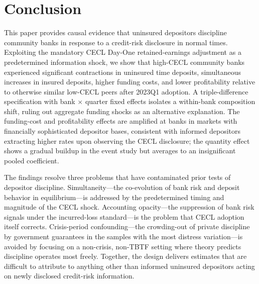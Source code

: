 
\section{Conclusion}
\label{sec:conclusion}

This paper provides causal evidence that uninsured depositors discipline community
banks in response to a credit-risk disclosure in normal times.  Exploiting the
mandatory CECL Day-One retained-earnings adjustment as a predetermined information
shock, we show that high-CECL community banks experienced significant contractions
in uninsured time deposits, simultaneous increases in insured deposits, higher
funding costs, and lower profitability relative to otherwise similar low-CECL
peers after 2023Q1 adoption.  A triple-difference specification with bank
$\times$ quarter fixed effects isolates a within-bank composition shift, ruling
out aggregate funding shocks as an alternative explanation.  The funding-cost and
profitability effects are amplified at banks in markets with financially
sophisticated depositor bases, consistent with informed depositors extracting
higher rates upon observing the CECL disclosure; the quantity effect shows a
gradual buildup in the event study but averages to an insignificant pooled
coefficient.

The findings resolve three problems that have contaminated prior tests of
depositor discipline.  Simultaneity---the co-evolution of bank risk and deposit
behavior in equilibrium---is addressed by the predetermined timing and magnitude
of the CECL shock.  Accounting opacity---the suppression of bank risk signals
under the incurred-loss standard---is the problem that CECL adoption itself
corrects.  Crisis-period confounding---the crowding-out of private discipline by
government guarantees in the samples with the most distress variation---is avoided
by focusing on a non-crisis, non-TBTF setting where theory predicts discipline
operates most freely.  Together, the design delivers estimates that are difficult
to attribute to anything other than informed uninsured depositors acting on newly
disclosed credit-risk information.

